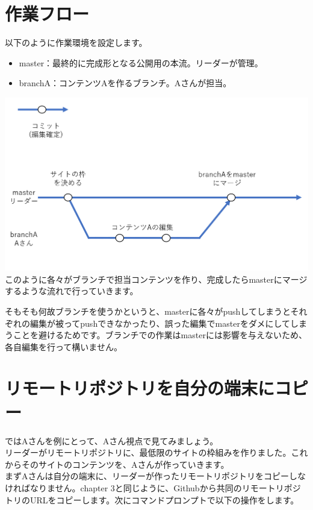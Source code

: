 \documentclass[
]{book}
\providecommand{\tightlist}{%
  \setlength{\itemsep}{0pt}\setlength{\parskip}{0pt}}
\begin{document}
\hypertarget{ux4f5cux696dux30d5ux30edux30fc}{%
\section{作業フロー}\label{ux4f5cux696dux30d5ux30edux30fc}}

以下のように作業環境を設定します。

\begin{itemize}
\tightlist
\item
  master：最終的に完成形となる公開用の本流。リーダーが管理。
\item
  branchA：コンテンツAを作るブランチ。Aさんが担当。
\end{itemize}

\includegraphics{pics/flow.png}
このように各々がブランチで担当コンテンツを作り、完成したらmasterにマージするような流れで行っていきます。

そもそも何故ブランチを使うかというと、masterに各々がpushしてしまうとそれぞれの編集が被ってpushできなかったり、誤った編集でmasterをダメにしてしまうことを避けるためです。ブランチでの作業はmasterには影響を与えないため、各自編集を行って構いません。

\hypertarget{ux30eaux30e2ux30fcux30c8ux30eaux30ddux30b8ux30c8ux30eaux3092ux81eaux5206ux306eux7aefux672bux306bux30b3ux30d4ux30fc}{%
\section{リモートリポジトリを自分の端末にコピー}\label{ux30eaux30e2ux30fcux30c8ux30eaux30ddux30b8ux30c8ux30eaux3092ux81eaux5206ux306eux7aefux672bux306bux30b3ux30d4ux30fc}}

ではAさんを例にとって、Aさん視点で見てみましょう。\\
リーダーがリモートリポジトリに、最低限のサイトの枠組みを作りました。これからそのサイトのコンテンツを、Aさんが作っていきます。\\
まずAさんは自分の端末に、リーダーが作ったリモートリポジトリをコピーしなければなりません。chapter 3と同じように、Githubから共同のリモートリポジトリのURLをコピーします。次にコマンドプロンプトで以下の操作をします。
\end{document}
